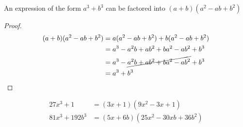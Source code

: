 \documentclass[english,seminar]{lecture}
\begin{document}
\begin{theorem}
	An expression of the form $a^3 + b^3$ can be factored into $(a + b)(a^2 - ab + b^2)$	
\end{theorem}

\begin{proof}
	\begin{align*}
		  (a+b)(a^2 - ab +b^2 )
		&= a(a^2 - ab +b^2 ) + b(a^2 - ab +b^2 ) \\
		&= a^3 - a^2b + ab^2 + ba^2 - ab^2 + b^3  \\
		&= a^3 - \cancel{a^2b + ab^2 + ba^2 - ab^2} + b^3  \\
		&= a^3 + b^3
	\end{align*}
\end{proof}

\begin{example}[Factor]
	\begin{align*}
		27x^3 + 1 &= (3x + 1)(9x^2 - 3x + 1) \\
		81x^3 + 192b^3 &= (5x + 6b)(25x^2 - 30xb + 36b^2)
	\end{align*}	
\end{example}
\end{document}
